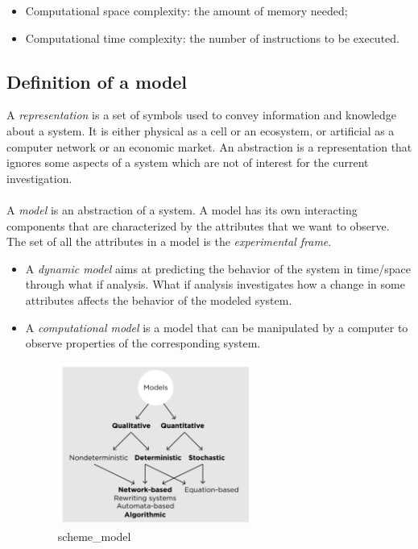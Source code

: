 \begin{itemize}
\tightlist
\item
  Computational space complexity: the amount of memory needed;
\item
  Computational time complexity: the number of instructions to be
  executed.
\end{itemize}


\subsection{Definition of a model}

A \emph{representation} is a set of symbols used to convey information
and knowledge about a system. It is either physical as a cell or an
ecosystem, or artificial as a computer network or an economic market. An
abstraction is a representation that ignores some aspects of a system
which are not of interest for the current investigation.
\\
\\
\noindent
A \emph{model} is an abstraction of a system. A model has its own interacting
components that are characterized by the attributes that we want to
observe. The set of all the attributes in a model is the
\emph{experimental frame}.

\begin{itemize}
\item
  A \emph{dynamic model} aims at predicting the behavior of the system
  in time/space through what if analysis. What if analysis investigates
  how a change in some attributes affects the behavior of the modeled
  system.
\item
  A \emph{computational model} is a model that can be manipulated by a
  computer to observe properties of the corresponding system.

  \begin{figure}
  \centering
  \includegraphics[width=0.6\textwidth]{scheme_model.png}
  \caption{scheme\_model}
  \end{figure}
\end{itemize}



